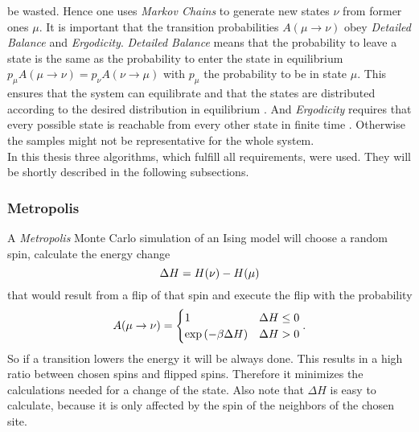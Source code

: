     be wasted.
    Hence one uses \emph{Markov Chains} to generate new states \(\nu\)
    from former ones \(\mu\). It is important that the transition probabilities
    \(A(\mu \to \nu)\) obey \emph{Detailed Balance} and \emph{Ergodicity}.
    \emph{Detailed Balance} means that the probability to leave a state is
    the same as the probability to enter the state in equilibrium
    \(p_\mu A(\mu \to \nu) = p_\nu A(\nu \to \mu)\) with \(p_\mu\) the
    probability to be in state \(\mu\). This ensures that the system can
    equilibrate and that the states are distributed according to the
    desired distribution in equilibrium \cite{NewmanBarkema1999}.
    And \emph{Ergodicity} requires that every possible state is reachable
    from every other state in finite time \cite{NewmanBarkema1999} \cite{Katzgraber2011}.
    Otherwise the samples might not be representative for the whole system.\\
    In this thesis three algorithms, which fulfill all requirements,
    were used. They will be shortly described in the following subsections.

    \subsubsection{Metropolis}
        A \emph{Metropolis} Monte Carlo \cite{Metropolis1953} simulation of an
        Ising model will choose a random spin, calculate the energy change
        \begin{equation}
            \Delta H = H(\nu) - H(\mu)\\
            \label{eq:dH}
        \end{equation}
        that would result from a flip of that spin and execute the flip
        with the probability \cite{NewmanBarkema1999} \cite{Katzgraber2011}
        \begin{equation}
            A(\mu \to \nu) =
            \begin{cases}
                1                            & \Delta H \le 0 \\
                \exp{\ensuremath{\left(-\beta \Delta H\right)}} & \Delta H > 0
            \end{cases}.
            \label{eq:metropolis}
        \end{equation}
        So if a transition lowers the energy it will be always done. This
        results in a high ratio between chosen spins and flipped spins.
        Therefore it minimizes the calculations needed for a change of
        the state. Also note that \(\Delta H\) is easy to calculate,
        because it is only affected by the spin of the neighbors of the
        chosen site.

